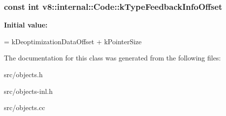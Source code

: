 \subsubsection[{k\+Type\+Feedback\+Info\+Offset}]{\setlength{\rightskip}{0pt plus 5cm}const int v8\+::internal\+::\+Code\+::k\+Type\+Feedback\+Info\+Offset\hspace{0.3cm}{\ttfamily [static]}}\label{classv8_1_1internal_1_1_code_a5ec9f802ed75109281eb87650ba00e6d}
{\bfseries Initial value\+:}
\begin{DoxyCode}
=
      kDeoptimizationDataOffset + kPointerSize
\end{DoxyCode}


The documentation for this class was generated from the following files\+:\begin{DoxyCompactItemize}
\item 
src/objects.\+h\item 
src/objects-\/inl.\+h\item 
src/objects.\+cc\end{DoxyCompactItemize}
